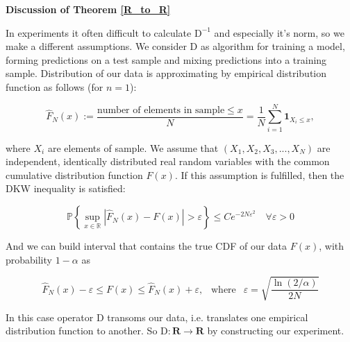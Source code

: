 \documentclass{article}
\begin{document}
    \textbf{Discussion of Theorem \ref{R_to_R}}

    In experiments it often difficult to calculate $\text{D}^{-1}$ and especially it's norm, so we make a different assumptions. We consider $\text{D}$ as algorithm for training a model, forming predictions on a test sample and mixing predictions into a training sample. Distribution of our data is approximating by empirical distribution function \cite{dvoretzky1956asymptotic} as follows (for $n=1$):

    \begin{equation}\label{F_approx}
        \hat{F}_N(x) := \dfrac{\text{number of elements in sample} \leq x}{N} = \dfrac{1}{N}\sum\limits_{i=1}^N \textbf{1}_{X_i \leq x},
    \end{equation}

    where $X_i$ are elements of sample. We assume that $(X_1, X_2, X_3, ... , X_N)$ are independent, identically distributed real random variables with the common cumulative distribution function $F(x)$. If this assumption is fulfilled, then the DKW inequality is satisfied:

    \begin{equation}\label{DKW}
        \mathbb{P}\left\{\underset{x \in \mathbb{R}}{\sup}\left|\hat{F}_N(x) - F(x)\right| > \varepsilon \right\} \leq C e^{-2N\varepsilon^2} \quad 
        \forall \varepsilon > 0
    \end{equation}

    And we can build interval that contains the true CDF of our data $F(x)$, with probability $1 - \alpha$ as

    \begin{equation}\label{inter}
        \hat{F}_N(x) - \varepsilon \leq F(x) \leq \hat{F}_N(x) + \varepsilon, ~~ \text{ where } ~~ \varepsilon = \sqrt{\dfrac{\ln(2/\alpha)}{2N}}
    \end{equation}

    In this case operator $\text{D}$ transoms our data, i.e. translates one empirical distribution function to another. So $\text{D} : \mathbf{R} \to \mathbf{R}$ by constructing our experiment.
\end{document}
